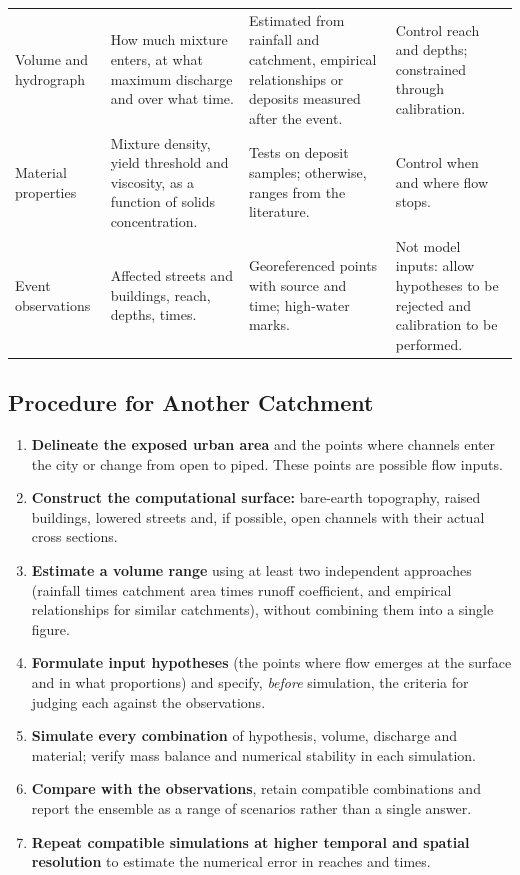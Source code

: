\begin{table}[htbp]
\begin{tabular}{p{}p{}p{}p{}}
Volume and hydrograph & How much mixture enters, at what maximum discharge and over what time. & Estimated from rainfall and catchment, empirical relationships or deposits measured after the event. & Control reach and depths; constrained through calibration.\\
Material properties & Mixture density, yield threshold and viscosity, as a function of solids concentration. & Tests on deposit samples; otherwise, ranges from the literature. & Control when and where flow stops.\\
Event observations & Affected streets and buildings, reach, depths, times. & Georeferenced points with source and time; high-water marks. & Not model inputs: allow hypotheses to be rejected and calibration to be performed.\\
\bottomrule\end{tabular}\end{table}

\subsection*{Procedure for Another Catchment}
\begin{enumerate}
\item \textbf{Delineate the exposed urban area} and the points where channels enter the city or change from open to piped. These points are possible flow inputs.
\item \textbf{Construct the computational surface:} bare-earth topography, raised buildings, lowered streets and, if possible, open channels with their actual cross sections.
\item \textbf{Estimate a volume range} using at least two independent approaches (rainfall times catchment area times runoff coefficient, and empirical relationships for similar catchments), without combining them into a single figure.
\item \textbf{Formulate input hypotheses} (the points where flow emerges at the surface and in what proportions) and specify, \emph{before} simulation, the criteria for judging each against the observations.
\item \textbf{Simulate every combination} of hypothesis, volume, discharge and material; verify mass balance and numerical stability in each simulation.
\item \textbf{Compare with the observations}, retain compatible combinations and report the ensemble as a range of scenarios rather than a single answer.
\item \textbf{Repeat compatible simulations at higher temporal and spatial resolution} to estimate the numerical error in reaches and times.
\end{enumerate}

